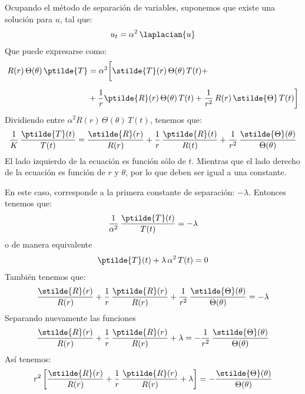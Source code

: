Ocupando el método de separación de variables, suponemos que existe una solución para $u$, tal que:
\begin{align*}
u_{t} = \alpha^{2} \, \laplacian{u}
\end{align*}
Que puede expresarse como:
\begin{align*}
R(r) \, \Theta (\theta) \, \ptilde{T} &= \alpha^{2} \bigg[ \stilde{T} (r) \, \Theta (\theta) \, T(t) + \\[0.5em]
&+ \dfrac{1}{r} \ptilde{R} (r) \, \Theta(\theta) \, T(t) + \dfrac{1}{r^{2}} \, R(r) \, \stilde{\Theta} \, T(t) \bigg]
\end{align*}
Dividiendo entre $\alpha^{2} R(r) \, \Theta (\theta) \, T(t)$, tenemos que:
\begin{align}
\dfrac{1}{K} \, \dfrac{\ptilde{T} (t)}{T (t)} = \dfrac{\stilde{R} (r)}{R (r)} + \dfrac{1}{r} \, \dfrac{\ptilde{R} (t)}{R (t)} + \dfrac{1}{r^{2}} \, \dfrac{\stilde{\Theta} (\theta)}{\Theta (\theta)}
\label{eq:ecuacion_K01}
\end{align}
El lado izquierdo de la ecuación es función sólo de $t$. Mientras que el lado derecho de la ecuación es función de $r$ y $\theta$, por lo que deben ser igual a una constante.
\par
En este caso, corresponde a la primera constante de separación: $- \lambda$. Entonces tenemos que:
\begin{align*}
\dfrac{1}{\alpha^{2}} \, \dfrac{\ptilde{T} (t)}{T (t)} = - \lambda
\end{align*}
o de manera equivalente
\begin{align}
\ptilde{T}(t) + \lambda \, \alpha^{2} \, T(t) = 0
\label{eq:ecuacion_K02}    
\end{align}
También tenemos que:
\begin{align*}
\dfrac{\stilde{R} (r)}{R (r)} + \dfrac{1}{r} \, \dfrac{\ptilde{R} (r)}{R (r)} + \dfrac{1}{r^{2}} \, \dfrac{\stilde{\Theta} (\theta)}{\Theta (\theta)} = - \lambda
\end{align*}
Separando nuevamente las funciones
\begin{align*}
\dfrac{\stilde{R} (r)}{R (r)} + \dfrac{1}{r} \, \dfrac{\ptilde{R} (r)}{R (r)} + \lambda = - \dfrac{1}{r^{2}} \, \dfrac{\stilde{\Theta} (\theta)}{\Theta (\theta)}
\end{align*}
Así tenemos:
\begin{align}
r^{2} \left[ \dfrac{\stilde{R} (r)}{R (r)} + \dfrac{1}{r} \, \dfrac{\ptilde{R} (r)}{R (r)} + \lambda \right] = - \dfrac{\stilde{\Theta} (\theta)}{\Theta (\theta)}
\label{eq:ecuacion_K03}    
\end{align}
